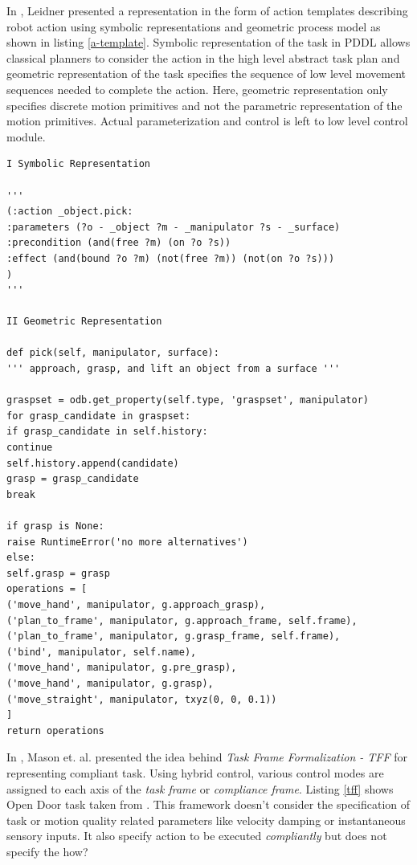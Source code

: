 \documentclass[thesis]{mas_proposal}
\begin{document}
In \cite{leidner2017cognitive}, Leidner presented a representation in the form of action templates describing robot action using symbolic representations and geometric process model as shown in listing \ref{a-template}.  Symbolic representation of the task in PDDL allows classical planners to consider the action in the high level abstract task plan and geometric representation of the task specifies the sequence of low level movement sequences needed to complete the action. Here, geometric representation only specifies discrete motion primitives and not the parametric representation of the motion primitives. Actual parameterization and control is left to low level control module.   

\begin{lstlisting}[label=a-template,caption=Action Template: \_object.pick]
I Symbolic Representation 

'''
(:action _object.pick: 
:parameters (?o - _object ?m - _manipulator ?s - _surface) 
:precondition (and(free ?m) (on ?o ?s)) 
:effect (and(bound ?o ?m) (not(free ?m)) (not(on ?o ?s)))
) 
''' 

II Geometric Representation

def pick(self, manipulator, surface):
''' approach, grasp, and lift an object from a surface '''

graspset = odb.get_property(self.type, 'graspset', manipulator) 
for grasp_candidate in graspset: 
if grasp_candidate in self.history: 
continue
self.history.append(candidate) 
grasp = grasp_candidate 
break

if grasp is None: 
raise RuntimeError('no more alternatives')
else: 
self.grasp = grasp
operations = [
('move_hand', manipulator, g.approach_grasp), 
('plan_to_frame', manipulator, g.approach_frame, self.frame), ('plan_to_frame', manipulator, g.grasp_frame, self.frame), 
('bind', manipulator, self.name), 
('move_hand', manipulator, g.pre_grasp), 
('move_hand', manipulator, g.grasp), 
('move_straight', manipulator, txyz(0, 0, 0.1))
] 
return operations
\end{lstlisting}

In \cite{mason1981compliance}, Mason et. al. presented the idea behind \textit{Task Frame Formalization - TFF} for representing compliant task. Using hybrid control, various control modes are assigned to each axis of the \textit{task frame} or \textit{compliance frame}\cite{nagele2018prototype}. Listing \ref{tff} shows Open Door task taken from \cite{bruyninckx1996specification}. This framework doesn't consider the specification of task or motion quality related parameters like velocity damping or instantaneous sensory inputs. It also specify action to be executed \textit{compliantly} but does not specify the how? 
\end{document}

